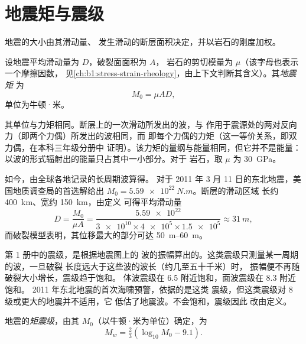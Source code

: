 \section{地震矩与震级}\label{sec:b1:earthquake-source:moment}

地震的大小由其滑动量、
发生滑动的断层面积决定，并以岩石的刚度加权。

\begin{definition}[地震矩]\label{def:b1:earthquake-source:moment}
设地震平均滑动量为 $D$，破裂面面积为 $A$，
岩石的剪切模量为 $\mu$（该字母也表示一个摩擦因数，
见\cref{ch:b1:stress-strain-rheology}，由上下文判断其含义）。其\emph{地震矩}
为
\[
  M_0 = \mu A D ,
\]
单位为牛顿·米。
\end{definition}

其单位与力矩相同。断层上的一次滑动所发出的波，与
作用于震源处的两对反向力（即两个力偶）所发出的波相同，而
即每个力偶的力矩（这一等价关系，即双力偶，在本科三年级分册中
证明）。该力矩的量纲与能量相同，但它并不是能量：
以波的形式辐射出的能量只占其中一小部分。对于
岩石，取 $\mu$ 为 \qty{30}{GPa}。

如今，由全球各地记录的长周期波算得。
对于 2011 年 3 月 11 日的东北地震，美国地质调查局的首选解给出
$M_0 = \qty{5.59e22}{N.m}$。断层的滑动区域
长约 \qty{400}{km}、宽约 \qty{150}{km}，由定义
可得平均滑动量
\[
  D = \frac{M_0}{\mu A}
    = \frac{\num{5.59e22}}{\num{3e10}\times\num{4e5}\times\num{1.5e5}}
    \approx \qty{31}{m} ,
\]
而破裂模型表明，其位移最大的部分可达
\qtyrange{50}{60}{m}。

第 1 册中的震级，是根据地震图上的
波的振幅算出的。这类震级只测量某一周期的波，一旦破裂
长度远大于这些波的波长（约几至五十千米）时，
振幅便不再随破裂大小增长，震级趋于饱和。
体波震级在 6.5 附近饱和，面波震级在 8.3 附近饱和。
2011 年东北地震的首次海啸预警，依据的是这类
震级，但这类震级对 8 级或更大的地震并不适用，它
低估了地震波。不会饱和，震级因此
改由定义。

\begin{definition}[矩震级]\label{def:b1:earthquake-source:mw}
地震的\emph{矩震级}，由其
$M_0$（以牛顿·米为单位）确定，为
\[
  M_w = \tfrac23\left(\log_{10} M_0 - 9.1\right) .
\]
\end{definition}

